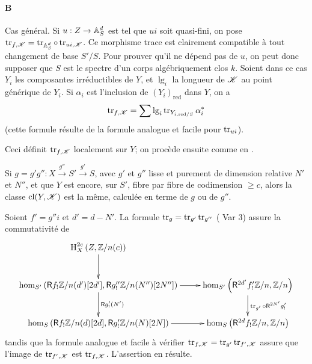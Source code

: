 \paragraph{B}
Cas général. Si $u:Z\to \mathbb{A}_S^d$ est tel que $u i$ soit quasi-fini, on pose 
$\operatorname{tr}_{f,\mathscr{K}} = \operatorname{tr}_{\mathbb{A}_S^d}\circ \operatorname{tr}_{u i,\mathscr{K}}$. Ce morphisme trace est 
clairement compatible à tout changement de base $S'/S$. Pour prouver qu'il ne 
dépend pas de $u$, on peut donc supposer que $S$ est le spectre d'un corps 
algébriquement clos $k$. Soient dans ce cas $Y_i$ les composantes 
irréductibles de $Y$, et $\operatorname{lg}_i$ la longueur de $\mathscr{K}$ au 
point générique de $Y_i$. Si $\alpha_i$ est l'inclusion de 
$(Y_i)_\text{red}$ dans $Y$, on a 
\begin{equation}\label{IV:eq:2-3-4-1}
  \operatorname{tr}_{f,\mathscr{K}} = \sum \operatorname{lg}_i \operatorname{tr}_{Y_{i,\text{red}/S}} \alpha_i^\ast
\end{equation}
(cette formule résulte de la formule analogue et facile pour $\operatorname{tr}_{u i}$). 

Ceci définit $\operatorname{tr}_{f,\mathscr{K}}$ localement sur $Y$; on procède ensuite comme en 
\cite[XVIII.2.9]{sga4}. 





\begin{lemma}\label{IV:2-3-5}
Si $g=g'g'':X\xrightarrow{g''} S'\xrightarrow{g'} S$, avec $g'$ et $g''$ lisse 
et purement de dimension relative $N'$ et $N''$, et que $Y$ est encore, sur 
$S'$, fibre par fibre de codimension $\geqslant c$, alors la classe 
$\operatorname{cl}(Y,\mathscr{K})$ est la même, calculée en terme de $g$ ou de 
$g''$.
\end{lemma}

Soient $f'=g'' i$ et $d'=d-N'$. La formule $\operatorname{tr}_g=\operatorname{tr}_{g'}\operatorname{tr}_{g''}$ 
(\cite[XVIII.2.9]{sga4} Var 3) assure la commutativité de 
\[\xymatrix{
  \h_X^{2 c}\left(Z,\dZ/n(c)\right) \ar[d] \\
  \hom_{S'}\left(\R f_!\dZ/n(d')[2 d'],\R g_!''\dZ/n(N'')[2 N'']\right) \ar[r] \ar[d]^-{\R g_!'(N')} 
    & \hom_{S'}\left(\R^{2 d'} f_!' \dZ/n,\dZ/n\right) \ar[d]^-{\tr_{g'}\circ \R^{2 N'} g_!'} \\
  \hom_S\left(\R f_!\dZ/n(d)[2d],\R g_!'\dZ/n(N)[2 N]\right) \ar[r] 
    & \hom_S\left(\R^{2 d} f_!\dZ/n,\dZ/n\right)
}\]
tandis que la formule analogue et facile à vérifier 
$\operatorname{tr}_{f,\mathscr{K}}=\operatorname{tr}_{g'}\operatorname{tr}_{f',\mathscr{K}}$ assure que l'image de $\operatorname{tr}_{f',\mathscr{K}}$ est 
$\operatorname{tr}_{f,\mathscr{K}}$. L'assertion en résulte. 





